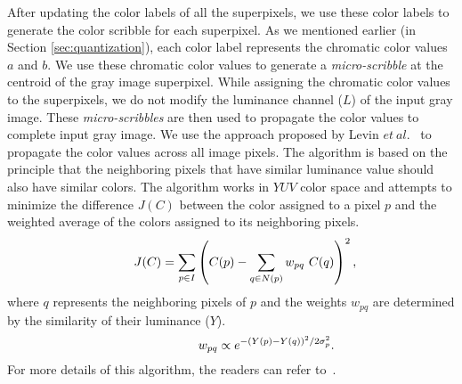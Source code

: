 \documentclass[twocolumn]{svjour3}          %
\begin{document}
After updating the color labels of all the superpixels, we use these color labels to generate the color scribble for each superpixel. As we mentioned earlier (in Section \ref{sec:quantization}), each color label represents the chromatic color values $a$ and $b$. We use these chromatic color values to generate a \emph{micro-scribble} at the centroid of the gray image superpixel. While assigning the chromatic color values to the superpixels, we do not modify the luminance channel ($L$) of the input gray image. These \emph{micro-scribbles} are then used to propagate the color values to complete input gray image. We use the approach proposed by Levin $et\ al.$~\cite{Levin04} to propagate the color values across all image pixels. The algorithm is based on the principle that the neighboring pixels that have similar luminance value should also have similar colors. The algorithm works in $YUV$ color space and attempts to minimize the difference $J(C)$ between the color assigned to a pixel $p$ and the weighted average of the colors assigned to its neighboring pixels.
\begin{equation}
\hspace{8mm}J(C) = \sum_{p\in I}\left(C(p)- \sum_{q\in N(p)} w_{pq}\ C(q) \right)^2,\end{equation}
where $q$ represents the neighboring pixels of $p$ and the weights $w_{pq}$ are determined by the similarity of their luminance ($Y$).
\begin{equation}
\hspace{20mm}w_{pq} \propto e^{-(Y(p)-Y(q))^2/2\sigma_{p}^2} .
\end{equation}
For more details of this algorithm, the readers can refer to~\cite{Levin04}.
\end{document}

